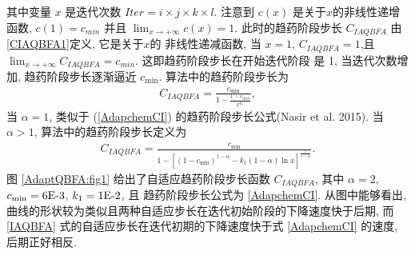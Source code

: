 其中变量 $x$ 是迭代次数 $Iter=i\times j\times k \times l$. 注意到 $c(x)$ 是关于$x$的非线性递增函数, $c(1)=c_{min}$ 并且 $\lim_{x\rightarrow+\infty}c(x)=1$. 此时的趋药阶段步长 $C_{IAQBFA}$ 由\eqref{CIAQBFA1}定义, 它是关于$x$的 非线性递减函数, 当 $x=1$, $C_{IAQBFA}=1$,且 $\lim_{x\rightarrow+\infty}C_{IAQBFA}=c_{min}$. 这即趋药阶段步长在开始迭代阶段 是 1,  当迭代次数增加, 趋药阶段步长逐渐逼近 $c_{\min}$. 算法中的趋药阶段步长为
\begin{align}\label{IAQBFA0}
    C_{IAQBFA}=\frac{c_{\min}}{1-\frac{1-c_{min}}{x^{k_{1}}}},
\end{align}
当 $\alpha=1$, 类似于 (\ref{AdapchemCI}) 的趋药阶段步长公式(Nasir et al. 2015). 当 $\alpha> 1$, 算法中的趋药阶段步长定义为
\begin{align}\label{IAQBFA}
    C_{IAQBFA}=\frac{c_{\min}}{1- \left[(1-c_{\min})^{{1-\alpha}}-k_1(1-\alpha)\ln x \right]^{\frac 1 {1-\alpha}}}.
\end{align}
图 \ref{AdaptQBFA:fig1} 给出了自适应趋药阶段步长函数 $C_{IAQBFA}$, 其中 $\alpha=2$, $c_{\min}=6\textup{E-}3$, $k_1=1\textup{E-}2$, 且 趋药阶段步长公式为 \eqref{AdapchemCI}. 从图中能够看出, 曲线的形状较为类似且两种自适应步长在迭代初始阶段的下降速度快于后期, 而 \eqref{IAQBFA} 式的自适应步长在迭代初期的下降速度快于式 \eqref{AdapchemCI} 的速度, 后期正好相反.
